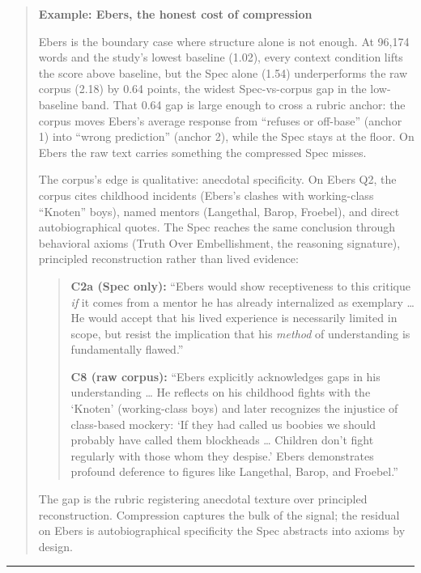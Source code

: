 \begin{quote}
\textbf{Example: Ebers, the honest cost of compression}

Ebers is the boundary case where structure alone is not enough. At
96,174 words and the study's lowest baseline (1.02), every context
condition lifts the score above baseline, but the Spec alone (1.54)
underperforms the raw corpus (2.18) by 0.64 points, the widest
Spec-vs-corpus gap in the low-baseline band. That 0.64 gap is large
enough to cross a rubric anchor: the corpus moves Ebers's average
response from ``refuses or off-base'' (anchor 1) into ``wrong
prediction'' (anchor 2), while the Spec stays at the floor. On Ebers the
raw text carries something the compressed Spec misses.

The corpus's edge is qualitative: anecdotal specificity. On Ebers Q2,
the corpus cites childhood incidents (Ebers's clashes with working-class
``Knoten'' boys), named mentors (Langethal, Barop, Froebel), and direct
autobiographical quotes. The Spec reaches the same conclusion through
behavioral axioms (Truth Over Embellishment, the reasoning signature),
principled reconstruction rather than lived evidence:

\begin{quote}
\textbf{C2a (Spec only):} ``Ebers would show receptiveness to this
critique \emph{if} it comes from a mentor he has already internalized as
exemplary \ldots{} He would accept that his lived experience is
necessarily limited in scope, but resist the implication that his
\emph{method} of understanding is fundamentally flawed.''

\textbf{C8 (raw corpus):} ``Ebers explicitly acknowledges gaps in his
understanding \ldots{} He reflects on his childhood fights with the
`Knoten' (working-class boys) and later recognizes the injustice of
class-based mockery: `If they had called us boobies we should probably
have called them blockheads \ldots{} Children don't fight regularly with
those whom they despise.' Ebers demonstrates profound deference to
figures like Langethal, Barop, and Froebel.''
\end{quote}

The gap is the rubric registering anecdotal texture over principled
reconstruction. Compression captures the bulk of the signal; the
residual on Ebers is autobiographical specificity the Spec abstracts
into axioms by design.
\end{quote}

\begin{center}\rule{0.5\linewidth}{0.5pt}\end{center}

